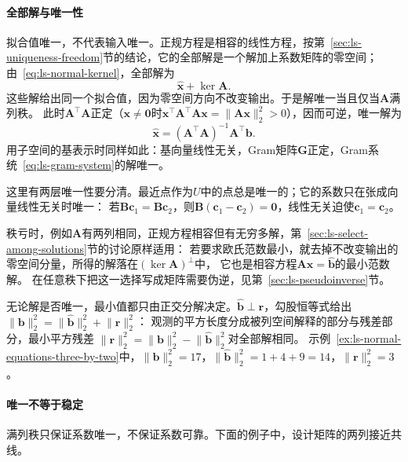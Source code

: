 \paragraph{全部解与唯一性}

拟合值唯一，不代表输入唯一。正规方程是相容的线性方程，按第~\ref{sec:ls-uniqueness-freedom}节的结论，它的全部解是一个解加上系数矩阵的零空间；
由~\eqref{eq:ls-normal-kernel}，全部解为
\begin{equation}
 \hat{\bm x}+\ker\bm A.
 \label{eq:ls-all-ordinary-solutions}
\end{equation}
这些解给出同一个拟合值，因为零空间方向不改变输出。于是解唯一当且仅当$\bm A$满列秩。
此时$\bm A^\top\bm A$正定（$\bm x\neq\bm0$时$\bm x^\top\bm A^\top\bm A\bm x=\lVert\bm A\bm x\rVert_2^2>0$），因而可逆，唯一解为
\begin{equation}
 \hat{\bm x}=(\bm A^\top\bm A)^{-1}\bm A^\top\bm b.
 \label{eq:linear-algebra-full-rank-least-squares}
\end{equation}
用子空间的基表示时同样如此：基向量线性无关，Gram矩阵$\bm G$正定，Gram系统~\eqref{eq:ls-gram-system}的解唯一。

这里有两层唯一性要分清。最近点作为$U$中的点总是唯一的；它的系数只在张成向量线性无关时唯一：
若$\bm B\bm c_1=\bm B\bm c_2$，则$\bm B(\bm c_1-\bm c_2)=\bm0$，线性无关迫使$\bm c_1=\bm c_2$。

秩亏时，例如$\bm A$有两列相同，正规方程相容但有无穷多解，第~\ref{sec:ls-select-among-solutions}节的讨论原样适用：
若要求欧氏范数最小，就去掉不改变输出的零空间分量，所得的解落在$(\ker\bm A)^\perp$中，
它也是相容方程$\bm A\bm x=\hat{\bm b}$的最小范数解。
在任意秩下把这一选择写成矩阵需要伪逆，见第~\ref{sec:ls-pseudoinverse}节。

无论解是否唯一，最小值都只由正交分解决定。$\hat{\bm b}\perp\bm r$，勾股恒等式给出
$\lVert\bm b\rVert_2^2=\lVert\hat{\bm b}\rVert_2^2+\lVert\bm r\rVert_2^2$：
观测的平方长度分成被列空间解释的部分与残差部分，最小平方残差
$\lVert\bm r\rVert_2^2=\lVert\bm b\rVert_2^2-\lVert\hat{\bm b}\rVert_2^2$对全部解相同。
示例~\ref{ex:ls-normal-equations-three-by-two}中，$\lVert\bm b\rVert_2^2=17$，$\lVert\hat{\bm b}\rVert_2^2=1+4+9=14$，$\lVert\bm r\rVert_2^2=3$。

\paragraph{唯一不等于稳定}

满列秩只保证系数唯一，不保证系数可靠。下面的例子中，设计矩阵的两列接近共线。

